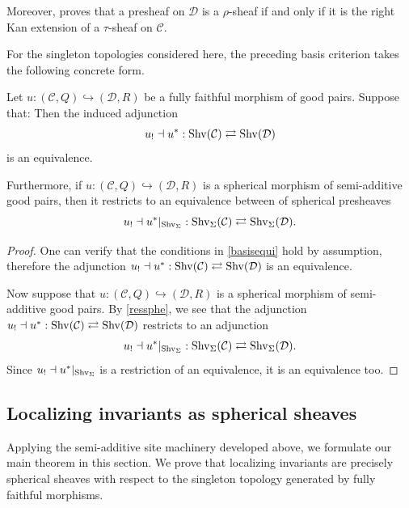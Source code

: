 \documentclass[a4paper,10pt, oneside]{amsart}
\begin{document}
	\begin{rem}
		Moreover, \cite[Lemma C.3]{hoyois2015quadratic} proves that a presheaf on $\mathcal{D}$ is a $\rho$-sheaf if and only if it is the right Kan extension of a $\tau$-sheaf on $\mathcal{C}$. 
	\end{rem}
	For the singleton topologies considered here, the preceding basis criterion takes the following concrete form.
	\begin{thm}\label{sphshvequi}
	Let $u: (\mathcal{C},Q) \hookrightarrow (\mathcal{D},R)$ be a fully faithful morphism of good pairs. Suppose that:
	Then the induced adjunction
	$$u_! \dashv u^* : \operatorname{Shv}(\mathcal{C}) \rightleftarrows \operatorname{Shv}(\mathcal{D})$$
	is an equivalence.
	
	Furthermore, if $u: (\mathcal{C},Q) \hookrightarrow (\mathcal{D},R)$ is a spherical morphism of semi-additive good pairs, then it restricts to an equivalence between \infcats of spherical presheaves
	$$u_! \dashv u^*|_{\operatorname{Shv}_\Sigma} : \operatorname{Shv}_\Sigma(\mathcal{C}) \rightleftarrows \operatorname{Shv}_\Sigma(\mathcal{D}).$$
	\end{thm}
\begin{proof}
	One can verify that the conditions in \cref{basisequi} hold by assumption, therefore the adjunction
	$u_! \dashv u^* : \operatorname{Shv}(\mathcal{C}) \rightleftarrows \operatorname{Shv}(\mathcal{D})$
	is an equivalence.
	
	Now suppose that $u: (\mathcal{C},Q) \hookrightarrow (\mathcal{D},R)$ is a spherical morphism of semi-additive good pairs. By \cref{ressphe}, we see that the adjunction
	$u_! \dashv u^* : \operatorname{Shv}(\mathcal{C}) \rightleftarrows \operatorname{Shv}(\mathcal{D})$
	restricts to an adjunction
	$$
	u_! \dashv u^*|_{\operatorname{Shv}_\Sigma} : \operatorname{Shv}_\Sigma(\mathcal{C}) \rightleftarrows \operatorname{Shv}_\Sigma(\mathcal{D}).
	$$
	Since $u_! \dashv u^*|_{\operatorname{Shv}_\Sigma}$ is a restriction of an equivalence, it is an equivalence too.
\end{proof}


	
	\subsection{Localizing invariants as spherical sheaves}
	Applying the semi-additive site machinery developed above, we formulate our main  theorem in this section. We prove that   localizing invariants  are precisely spherical sheaves with respect to the singleton topology generated by fully faithful morphisms.
	
\end{document}
